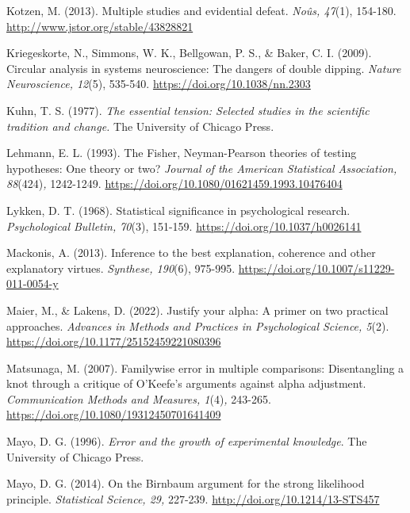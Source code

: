 \documentclass[authordate, meta]{jote-new-article}
\begin{document}
	Kotzen, M. (2013). Multiple studies and evidential defeat. \emph{Noûs, 47}(1), 154-180. \url{http://www.jstor.org/stable/43828821}



	Kriegeskorte, N., Simmons, W. K., Bellgowan, P. S., \& Baker, C. I. (2009). Circular analysis in systems neuroscience: The dangers of double dipping. \emph{Nature Neuroscience, 12}(5), 535-540. \url{https://doi.org/10.1038/nn.2303}



	Kuhn, T. S. (1977). \emph{The essential tension: Selected studies in the scientific tradition and change. }The University of Chicago Press.



	Lehmann, E. L. (1993). The Fisher, Neyman-Pearson theories of testing hypotheses: One theory or two? \emph{Journal of the American Statistical Association, 88}(424)\emph{,} 1242-1249. \url{https://doi.org/10.1080/01621459.1993.10476404}



	Lykken, D. T. (1968). Statistical significance in psychological research. \emph{Psychological Bulletin, 70}(3), 151-159. \url{https://doi.org/10.1037/h0026141}



	Mackonis, A. (2013). Inference to the best explanation, coherence and other explanatory virtues. \emph{Synthese, 190}(6), 975-995. \url{https://doi.org/10.1007/s11229-011-0054-y}



	Maier, M., \& Lakens, D. (2022). Justify your alpha: A primer on two practical approaches. \emph{Advances in Methods and Practices in Psychological Science, 5}(2). \url{https://doi.org/10.1177/25152459221080396}



	Matsunaga, M. (2007). Familywise error in multiple comparisons: Disentangling a knot through a critique of O'Keefe's arguments against alpha adjustment. \emph{Communication Methods and Measures, 1}(4)\emph{, }243-265. \url{https://doi.org/10.1080/19312450701641409}



	Mayo, D. G. (1996). \emph{Error and the growth of experimental knowledge}. The University of Chicago Press.



	Mayo, D. G. (2014). On the Birnbaum argument for the strong likelihood principle. \emph{Statistical Science, 29,} 227-239. \url{http://doi.org/10.1214/13-STS457}
\end{document}
